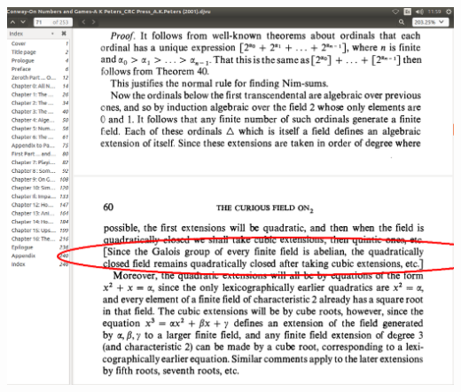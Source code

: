 \documentclass[10pt,spanish]{beamer}
\def\key#1{\{#1\}}
\begin{document}
\begin{frame}{}








\centering
\hspace*{-2.3cm}\vspace*{1cm}\includegraphics[scale=0.45]{claim.png}

\end{frame}
\end{document}
